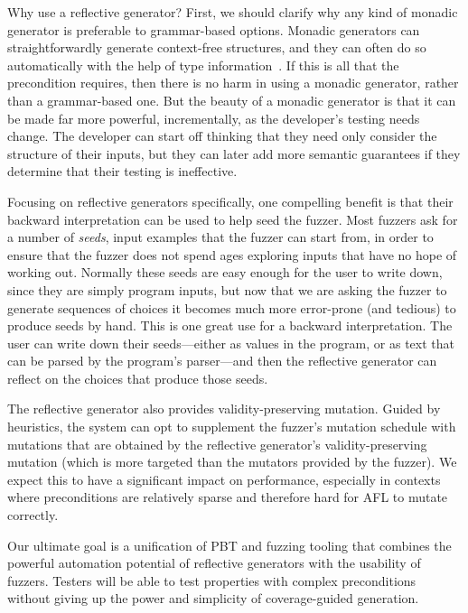 Why use a reflective generator? First, we should clarify why any kind of monadic
generator is preferable to grammar-based options. Monadic generators can
straightforwardly generate context-free structures, and they can often do so
automatically with the help of type information~\cite{mista2019deriving}. If
this is all that the precondition requires, then there is no harm in using a
monadic generator, rather than a grammar-based one. But the beauty of a monadic
generator is that it can be made far more powerful, incrementally, as the
developer's testing needs change. The developer can start off thinking that they
need only consider the structure of their inputs, but they can later add more
semantic guarantees if they determine that their testing is ineffective.

Focusing on reflective generators specifically, one compelling benefit is that
their backward interpretation can be used to help seed the fuzzer.  Most fuzzers
ask for a number of {\em seeds}, input examples that the fuzzer can start from,
in order to ensure that the fuzzer does not spend ages exploring
inputs that have no hope of working out. Normally these seeds are easy enough
for the user to write down, since they are simply program inputs, but now that
we are asking the fuzzer to generate sequences of choices it becomes much more
error-prone (and tedious) to produce seeds by hand.  This is one great use for a
backward interpretation. The user can write down their seeds---either as values
in the program, or as text that can be parsed by the program's parser---and then
the reflective generator can reflect on the choices that produce those seeds.

The reflective generator also provides validity-preserving mutation. Guided by
heuristics, the system can opt to supplement the fuzzer's mutation schedule with
mutations that are obtained by the reflective generator's validity-preserving
mutation (which is more targeted than the mutators provided by the fuzzer). We
expect this to have a significant impact on performance, especially in contexts
where preconditions are relatively sparse and therefore hard for AFL to mutate
correctly.

Our ultimate goal is a unification of PBT and fuzzing tooling that combines the
powerful automation potential of reflective generators with the usability of
fuzzers. Testers will be able to test properties with complex preconditions
without giving up the power and simplicity of coverage-guided generation.
 

